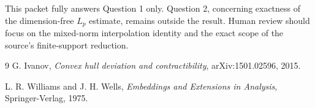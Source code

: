 \documentclass[11pt]{article}
\begin{document}
This packet fully answers Question 1 only.  Question 2, concerning exactness
of the dimension-free $L_p$ estimate, remains outside the result.  Human
review should focus on the mixed-norm interpolation identity and the exact
scope of the source's finite-support reduction.

\begin{thebibliography}{9}
G. Ivanov,
\emph{Convex hull deviation and contractibility},
arXiv:1501.02596, 2015.

L. R. Williams and J. H. Wells,
\emph{Embeddings and Extensions in Analysis},
Springer-Verlag, 1975.
\end{thebibliography}
\end{document}
